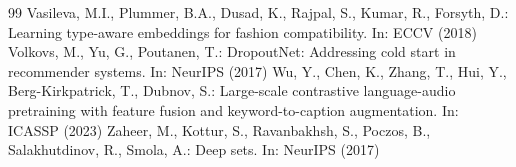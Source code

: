 \documentclass[runningheads]{llncs}
\begin{document}
\begin{thebibliography}{99}
 Vasileva, M.I., Plummer, B.A., Dusad, K., Rajpal, S., Kumar, R., Forsyth, D.: Learning type-aware embeddings for fashion compatibility. In: ECCV (2018)
 Volkovs, M., Yu, G., Poutanen, T.: DropoutNet: Addressing cold start in recommender systems. In: NeurIPS (2017)
 Wu, Y., Chen, K., Zhang, T., Hui, Y., Berg-Kirkpatrick, T., Dubnov, S.: Large-scale contrastive language-audio pretraining with feature fusion and keyword-to-caption augmentation. In: ICASSP (2023)
 Zaheer, M., Kottur, S., Ravanbakhsh, S., Poczos, B., Salakhutdinov, R., Smola, A.: Deep sets. In: NeurIPS (2017)
\end{thebibliography}
\end{document}
